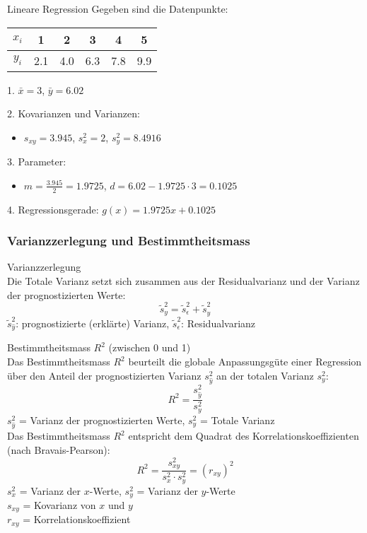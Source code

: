 \begin{example2}{Lineare Regression}
Gegeben sind die Datenpunkte:
\begin{center}
\begin{tabular}{|c|c|c|c|c|c|}
\hline
$x_i$ & 1 & 2 & 3 & 4 & 5 \\
\hline
$y_i$ & 2.1 & 4.0 & 6.3 & 7.8 & 9.9 \\
\hline
\end{tabular}
\end{center}

1. $\bar{x} = 3$, $\bar{y} = 6.02$

2. Kovarianzen und Varianzen:
   \begin{itemize}
     \item $s_{xy} = 3.945$, $s_x^2 = 2$, $s_y^2 = 8.4916$
   \end{itemize}

3. Parameter:
   \begin{itemize}
     \item $m = \frac{3.945}{2} = 1.9725$, $d = 6.02 - 1.9725 \cdot 3 = 0.1025$
   \end{itemize}

4. Regressionsgerade: $g(x) = 1.9725x + 0.1025$
\end{example2}

\subsubsection{Varianzzerlegung und Bestimmtheitsmass}

\begin{concept}{Varianzzerlegung}\\
Die Totale Varianz setzt sich zusammen aus der Residualvarianz und der Varianz der prognostizierten Werte:
$$\tilde{s}_y^2 = \tilde{s}_\epsilon^2 + \tilde{s}_{\hat{y}}^2$$
$\tilde{s}_{\hat{y}}^2$: prognostizierte (erklärte) Varianz,
$\tilde{s}_\epsilon^2$: Residualvarianz
\end{concept}

\begin{theorem}{Bestimmtheitsmass} $R^2$ (zwischen 0 und 1)\\
Das Bestimmtheitsmass $R^2$ beurteilt die globale Anpassungsgüte einer Regression über den Anteil der prognostizierten Varianz $s_{\hat{y}}^2$ an der totalen Varianz $s_y^2$:
$$
R^2=\frac{s_{\hat{y}}^2}{s_y^2}
$$
$s_{\hat{y}}^2$ = Varianz der prognostizierten Werte,
$s_y^2$ = Totale Varianz\\

Das Bestimmtheitsmass $R^2$ entspricht dem Quadrat des Korrelationskoeffizienten (nach Bravais-Pearson):
$$
R^2=\frac{s_{xy}^2}{s_x^2 \cdot s_y^2}=(r_{xy})^2
$$
$s_x^2$ = Varianz der $x$-Werte,
$s_y^2$ = Varianz der $y$-Werte\\
$s_{xy}$ = Kovarianz von $x$ und $y$\\ $r_{xy}$ = Korrelationskoeffizient
\end{theorem}

